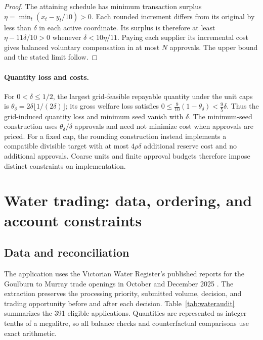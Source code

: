 \documentclass[ecta,draft,supplement]{econsocart}
\theoremstyle{definition}
\theoremstyle{definition}
\begin{document}
\begin{appendix}
\begin{proof}
The attaining schedule has minimum transaction surplus
$\eta=\min_t(x_t-y_t/10)>0$. Each rounded increment differs from
its original by less than $\delta$ in each active coordinate.
Its surplus is therefore at least $\eta-11\delta/10>0$ whenever
$\delta<10\eta/11$. Paying each supplier its incremental cost
gives balanced voluntary compensation in at most $N$ approvals.
The upper bound and the stated limit follow.
\end{proof}

\paragraph{Quantity loss and costs.}
For $0<\delta\leq1/2$, the largest grid-feasible repayable quantity
under the unit caps is
$\theta_\delta=2\delta\lfloor1/(2\delta)\rfloor$; its gross
welfare loss satisfies
$0\leq\frac9{10}(1-\theta_\delta)<\frac95\delta$.
Thus the grid-induced quantity loss and minimum seed vanish with
$\delta$. The minimum-seed construction uses
$\theta_\delta/\delta$ approvals and need not minimize cost when
approvals are priced. For a fixed cap, the rounding construction
instead implements a compatible divisible target with at most
$4\rho\delta$ additional reserve cost and no additional approvals.
Coarse units and finite approval budgets therefore impose distinct
constraints on implementation.

\section{Water trading: data, ordering, and account constraints}
\label{app:waterbenchmark}

\subsection{Data and reconciliation}

The application uses the Victorian Water Register's published reports for
the Goulburn to Murray trade openings in October and December 2025
\citep{DEECA2025October,DEECA2025December}. The extraction preserves the
processing priority, submitted volume, decision, and trading opportunity
before and after each decision. Table~\ref{tab:wateraudit} summarizes the
391 eligible applications. Quantities are represented as integer tenths
of a megalitre, so all balance checks and counterfactual comparisons use
exact arithmetic.


\end{appendix}
\end{document}
